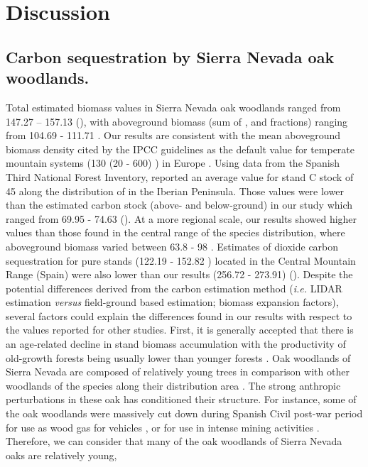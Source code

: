 \section{Discussion}\label{sec:carbon:discussion}
\subsection{Carbon sequestration by Sierra Nevada oak woodlands.}\label{sec:carbon:discussion-sn}

Total estimated biomass values in Sierra Nevada oak woodlands ranged from 147.27 -- 157.13 \mgha (), with aboveground biomass (sum of \ws, \wb and \wbs fractions) ranging from 104.69 - 111.71 \mgha. Our results are consistent with the mean aboveground biomass density cited by the IPCC guidelines as the default value for temperate mountain systems (130 (20 - 600) \mgha) in Europe \autocite{IPCC2006ForestLand}. Using data from the Spanish Third National Forest Inventory, \citet{Vayredaetal2012SpatialPatterns} reported an average value for stand C stock of 45 \mgha along the distribution of \Qp in the Iberian Peninsula. Those values were lower than the estimated carbon stock (above- and below-ground) in our study which ranged from 69.95 - 74.63 \mgha (). At a more regional scale, our results showed higher values than those found in the central range of the species distribution, where aboveground biomass varied between 63.8 - 98 \mgha \autocite{GallardoLanchoGonzalezHernandez2004SequestrationCarbon}. Estimates of dioxide carbon sequestration for \Qp pure stands (122.19 - 152.82 \mgha) located in the Central Mountain Range (Spain) \autocite{Canellasetal2008SilvicultureCarbon,Canellasetal2017CarbonSequestration} were also lower than our results (256.72 - 273.91) (). Despite the potential differences derived from the carbon estimation method (\emph{i.e.} LIDAR estimation \emph{versus} field-ground based estimation; biomass expansion factors), several factors could explain the differences found in our results with respect to the values reported for other studies. First, it is generally accepted that there is an age‐related decline in stand biomass accumulation \autocite[ and references therein]{Xuetal2012AgerelatedDecline} with the productivity of old-growth forests being usually lower than younger forests \autocite{Kutschetal2009EcophysiologicalCharacteristics}. Oak woodlands of Sierra Nevada are composed of relatively young trees \autocite{GeaIzquierdoCanellas2014LocalClimate,PerezLuqueetal2020LanduseLegacies,RubioCuadradoetal2018AbioticFactors} in comparison with other woodlands of the species along their distribution area \autocite{GeaIzquierdoCanellas2014LocalClimate}. The strong anthropic perturbations in these oak has conditioned their structure. For instance, some of the oak woodlands were massively cut down during Spanish Civil post-war period for use as wood gas for vehicles \autocite[\emph{e.g.} MON population;][]{Prieto1975BosquesSierra}, or for use in intense mining activities \autocite[\emph{e.g.} GEN population;][]{PerezLuqueetal2020LanduseLegacies}. Therefore, we can consider that many of the oak woodlands of Sierra Nevada oaks are relatively young, 